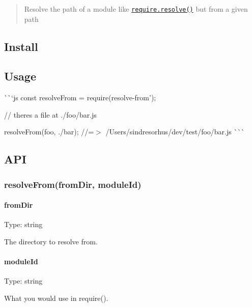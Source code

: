 \begin{quote}
Resolve the path of a module like \href{http://nodejs.org/api/globals.html#globals_require_resolve}{\tt {\ttfamily require.\+resolve()}} but from a given path \end{quote}


\subsection*{Install}




\subsection*{Usage}

\`{}\`{}`js const resolve\+From = require(\textquotesingle{}resolve-\/from');

// there\textquotesingle{}s a file at {\ttfamily ./foo/bar.js}

resolve\+From(\textquotesingle{}foo\textquotesingle{}, \textquotesingle{}./bar\textquotesingle{}); //=$>$ \textquotesingle{}/\+Users/sindresorhus/dev/test/foo/bar.js\textquotesingle{} \`{}\`{}\`{}

\subsection*{A\+PI}

\subsubsection*{resolve\+From(from\+Dir, module\+Id)}

\paragraph*{from\+Dir}

Type\+: {\ttfamily string}

The directory to resolve from.

\paragraph*{module\+Id}

Type\+: {\ttfamily string}

What you would use in {\ttfamily require()}.

